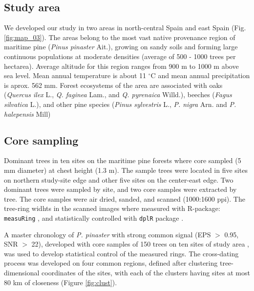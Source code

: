 \documentclass[review,authoryear]{elsarticle}
\begin{document}
\subsection{Study area}
We developed our study in two areas in north-central Spain and east
Spain (Fig. \ref{fig:map_03}). The areas belong to the most vast
native provenance region of maritime pine (\textit{Pinus pinaster}
Ait.), growing on sandy soils and forming large continuous populations
at moderate densities (average of 500 - 1000 trees per hectarea).
Average altitude for this region ranges from 900 m to 1000 m above sea
level. Mean annual temperature is about 11 $^{\circ}$C and mean annual
precipitation is aprox. 562 mm. %
Forest ecosystems of the area are associated with oaks
(\textit{Quercus ilex} L., \textit{Q. faginea} Lam., and
\textit{Q. pyrenaica} Willd.), beeches (\textit{Fagus silvatica} L.),
and other pine species (\textit{Pinus sylvestris} L.,
\textit{P. nigra} Arn. and \textit{P.  halepensis} Mill)

\subsection{Core sampling}
Dominant trees in ten sites on the maritime pine forests where core
sampled (5 mm diameter) at chest height (1.3 m). The sample trees were
located in five sites on northern study-site edge and other five sites
on the center-east edge. Two dominant trees were sampled by site, and
two core samples were extracted by tree. The core samples were air
dried, sanded, and scanned (1000:1600 ppi). The tree-ring widhts in
the scanned images where measured with R-package: {\tt measuRing}
\citep{Lara2015}, and statistically controlled with {\tt dplR} package
\citep{Bunn2010}.

A master chronology of \textit{P. pinaster} with strong common signal
(EPS $>$ 0.95, SNR $>$ 22), developed with core samples of 150 trees
on ten sites of study area \citep{Bogino2008}, was used to develop
statistical control of the measured rings. The cross-dating process
was developed on four common regions, defined after clustering
tree-dimensional coordinates of the sites, with each of the clusters
having sites at most 80 km of closeness (Figure \ref{fig:clust}).
\end{document}
